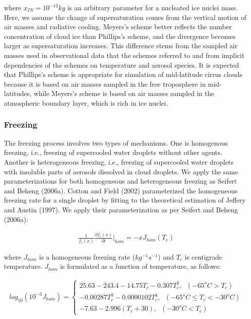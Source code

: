 where $x_{IN} = 10^{-12} kg$ is an arbitrary parameter for a nucleated ice nuclei mass. Here, we assume the change of supersaturation comes from the vertical motion of air masses and radiative cooling. Meyers’s scheme better reflects the number concentration of cloud ice than Phillips’s scheme, and the divergence becomes larger as supersaturation increases. This difference stems from the sampled air masses used in observational data that the schemes referred to and from implicit dependencies of the schemes on temperature and aerosol species. It is expected that Phillips’s scheme is appropriate for simulation of mid-latitude cirrus clouds because it is based on air masses sampled in the free troposphere in mid-latitudes, while Meyers’s scheme is based on air masses sampled in the atmospheric boundary layer, which is rich in ice nuclei.

\subsubsection{Freezing}
The freezing process involves two types of mechanisms. One is homogenous freezing, i.e., freezing of supercooled water droplets without other agents. Another is heterogeneous freezing, i.e., freezing of supercooled water droplets with insoluble parts of aerosols dissolved in cloud droplets. We apply the same parameterizations for both homogeneous and heterogeneous freezing as Seifert and Beheng (2006a). Cotton and Field (2002) parameterized the homogeneous freezing rate for a single droplet by fitting to the theoretical estimation of Jeffery and Austin (1997). We apply their parameterization as per Seifert and Beheng (2006a):

\begin{eqnarray}
\frac{1}{f_{c}(x)}\frac{\partial f_{c}(x)}{\partial t}\Bigr|_{hom}=-xJ_{hom}(T_{c})\label{sn120}
\end{eqnarray}

where $J_{hom}$ is a homogeneous freezing rate ($kg^{-1}s^{-1}$) and $T_{c}$ is centigrade temperature. $J_{hom}$ is formulated as a function of temperature, as follows:

\begin{eqnarray}
log_{10}(10^{-3}J_{hom})=
\left\{
\begin{array}{l}
25.63-243.4-14.75T_{c}-0.307T_{c}^{2},\;\;(-65^{o}C>T_{c}) \nonumber \\
-0.00287T_{c}^{3}-0.0000102T_{c}^{4},\;\;(-65^{o}C\leq T_{c}<-30^{o}C)\nonumber \\
-7.63-2.996(T_{c}+30),\;\;(-30^{o}C< T_{c})\nonumber
\end{array}
\label{sn121}
\right.
\end{eqnarray}

